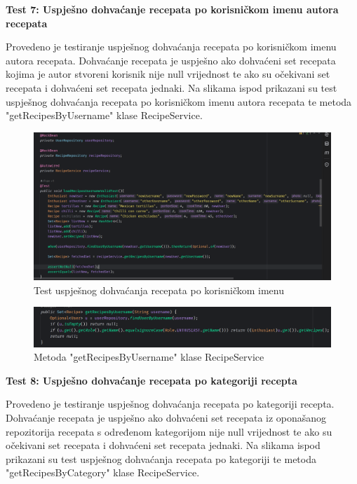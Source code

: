 		\textbf{Test 7: Uspješno dohvaćanje recepata po korisničkom imenu autora recepata}
		
		Provedeno je testiranje uspješnog dohvaćanja recepata po korisničkom imenu autora recepata. Dohvaćanje recepata je uspješno ako dohvaćeni set recepata kojima je autor stvoreni korisnik nije null vrijednost te ako su očekivani set recepata i dohvaćeni set recepata jednaki. Na slikama ispod prikazani su test uspješnog dohvaćanja recepata po korisničkom imenu autora recepata te metoda "getRecipesByUsername" klase RecipeService.

		\begin{figure}[H]
			\includegraphics[scale=0.4]{slike/loadRecipesUsernameValidTest.PNG} %
			\centering
			\caption{Test uspješnog dohvaćanja recepata po korisničkom imenu}
			\label{Test uspješnog dohvaćanja recepata po korisničkom imenu}
		\end{figure}
		
				\begin{figure}[H]
			\includegraphics[scale=0.4]{slike/getRecipesByUsername.PNG} %
			\centering
			\caption{Metoda "getRecipesByUsername" klase RecipeService}
			\label{Metoda "getRecipesByUsername" klase RecipeService}
		\end{figure}

		\textbf{Test 8: Uspješno dohvaćanje recepata po kategoriji recepta}
		
		Provedeno je testiranje uspješnog dohvaćanja recepata po kategoriji recepta. Dohvaćanje recepata je uspješno ako dohvaćeni set recepata iz oponašanog repozitorija recepata s određenom kategorijom nije null vrijednost te ako su očekivani set recepata i dohvaćeni set recepata jednaki. Na slikama ispod prikazani su test uspješnog dohvaćanja recepata po kategoriji te metoda "getRecipesByCategory" klase RecipeService.
		
